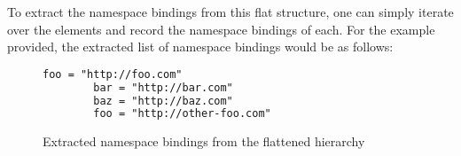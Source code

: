 To extract the namespace bindings from this flat structure,
one can simply iterate over the elements and record the namespace bindings of each.
For the example provided, the extracted list of namespace bindings would be as follows:

\begin{figure}[H]
    \caption{Extracted namespace bindings from the flattened hierarchy}
    \label{fig:custom_namespace_notation_example_flattened_extracted}
    \begin{lstlisting}[language=XML]
        foo = "http://foo.com"
        bar = "http://bar.com"
        baz = "http://baz.com"
        foo = "http://other-foo.com"
    \end{lstlisting}
\end{figure}








